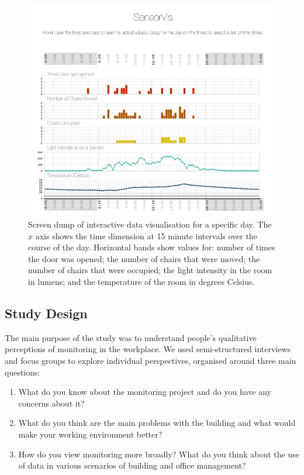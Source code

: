 \begin{figure}[H]
  \centering
  \includegraphics[scale=0.3]{images/occupancy.png}
  \caption{Screen dump of interactive data visualisation for a
    specific day. The $x$ axis shows the time dimension at 15 minute
    intervals over the course of the day. Horizontal bands show values
    for:  number of times the
    door was opened; the number of chairs that were moved; the number
    of chairs that were occupied; the light intensity in the room
    in lumens; and the temperature of the room in degrees Celsius.}
  \label{fig:dataviz}
\end{figure}

\subsection{Study Design}
\label{sec:study-design}

The main purpose of the study was to understand people’s qualitative
perceptions of monitoring in the workplace. We used semi-structured
interviews and focus groups to explore individual perspectives, organised around three main
questions:
\begin{enumerate}[noitemsep]
\item What do you know about the monitoring project and do you have
  any concerns about it?
\item What do you think are the main problems with the building and
  what would make your working environment better?
\item How do you view monitoring more broadly? What do you think about
  the use of data in various scenarios of building and office
  management?
\end{enumerate}


